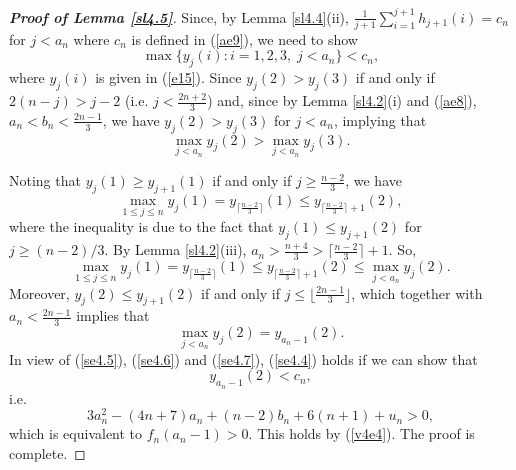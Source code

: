 \documentclass[12pt, A4paper, oneside]{article}
\theoremstyle{plain}
\numberwithin{equation}{section}
\begin{document}
\begin{proof}[\bf Proof of Lemma \ref{sl4.5}]
Since, by Lemma \ref{sl4.4}(ii), $\frac{1}{j+1}\sum_{i=1}^{j+1}h_{j+1}(i)=c_n$ for $j<a_n$ where $c_n$ is defined in (\ref{ae9}), we need to show \begin{equation}\label{se4.4}
\max\{y_j(i):i=1,2,3,\;j<a_n\}<c_n,
\end{equation}
where $y_j(i)$ is given in (\ref{e15}).
Since $y_j(2)>y_j(3)$ if and only if $2(n-j)>j-2$ (i.e. $j<\frac{2n+2}{3}$) and, since by Lemma \ref{sl4.2}(i) and (\ref{ae8}), $a_n<b_n<\frac{2n-1}{3}$, we have $y_j(2)>y_j(3)$ for $j<a_n$, implying that
\begin{equation}\label{se4.5}
\max_{j<a_n}y_j(2)>\max_{j<a_n}y_j(3).
\end{equation}

Noting that $y_j(1)\ge y_{j+1}(1)$ if and only if $j\ge\frac{n-2}{3}$, we have
\begin{equation*}
\max_{1\le j\le n}y_j(1)=y_{\lceil\frac{n-2}{3}\rceil}(1)\le y_{\lceil\frac{n-2}{3}\rceil+1}(2),
\end{equation*}
where the inequality is due to the fact that $y_j(1)\le y_{j+1}(2)$ for $j\ge(n-2)/3$.
By Lemma \ref{sl4.2}(iii), $a_n>\frac{n+4}{3}>\lceil\frac{n-2}{3}\rceil+1$. So,
\begin{equation}\label{se4.6}
\max_{1\le j\le n}y_j(1)=y_{\lceil\frac{n-2}{3}\rceil}(1)\le y_{\lceil\frac{n-2}{3}\rceil+1}(2)\le\max_{j<a_n}y_j(2).
\end{equation}
Moreover, $y_j(2)\le y_{j+1}(2)$ if and only if $j\le\lfloor\frac{2n-1}{3}\rfloor$, which together with $a_n<\frac{2n-1}{3}$ implies that
\begin{equation}\label{se4.7}
\max_{j<a_n}y_j(2)=y_{a_n-1}(2).
\end{equation}
In view of (\ref{se4.5}), (\ref{se4.6}) and (\ref{se4.7}), (\ref{se4.4}) holds if we can show that
\begin{equation*}
y_{a_n-1}(2)<c_n,
\end{equation*}
i.e.
$$
3a_n^2-(4n+7)a_n+(n-2)b_n+6(n+1)+u_n>0,
$$
which is equivalent to $f_n(a_n-1)>0$. This holds by (\ref{v4e4}). The proof is complete.
\end{proof}
\end{document}
